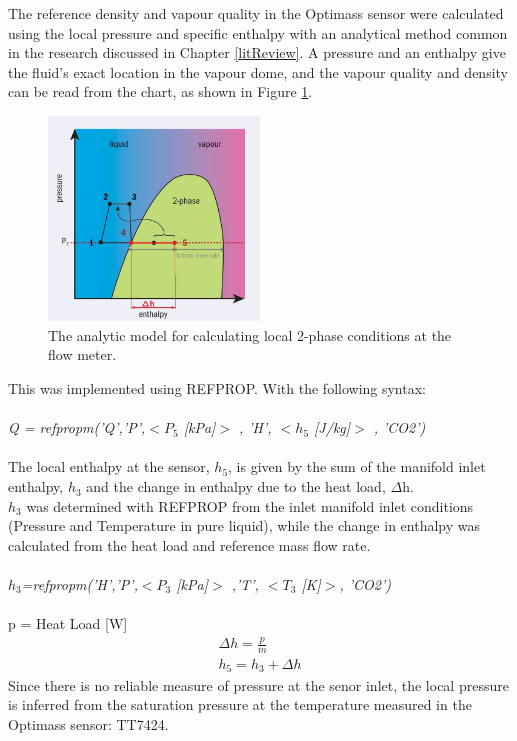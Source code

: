 \documentclass{report}
\begin{document}
The reference density and vapour quality in the Optimass sensor were calculated using the local pressure and specific enthalpy with an analytical method common in the research discussed in Chapter \ref{litReview}. A pressure and an enthalpy give the fluid's exact location in the vapour dome, and the vapour quality and density can be read from the chart, as shown in Figure \ref{fig:enthalpyMethod}. \FloatBarrier
\begin{figure}
\centering
\includegraphics[width=0.5\textwidth]{enthalpyMethod.jpg}
\caption{The analytic model for calculating local 2-phase conditions at the flow meter.}
\label{fig:enthalpyMethod}
\end{figure}
\FloatBarrier
This was implemented using REFPROP. With the following syntax: \\\\
\textit{Q = refpropm('Q','P',$<P_5$ [kPa]$>$ , 'H', $<h_5$ [J/kg]$>$ , 'CO2')} \\\\
The local enthalpy at the sensor, \textit{$h_5$}, is given by the sum of the manifold inlet enthalpy, $h_3$ and the change in enthalpy due to the heat load, $\Delta$h.\\
\textit{$h_3$} was determined with REFPROP from the inlet manifold inlet conditions (Pressure and Temperature in pure liquid), while the change in enthalpy was calculated from the heat load and reference mass flow rate.\\\\
\textit{$h_3$=refpropm('H','P',$<P_3$ [kPa]$>$ ,'T', $<T_3$ [K]$>$, 'CO2')}\\\\
p = Heat Load [W]\\
\begin{eqnarray}
\Delta h=\frac{p}{\dot{m}}\\
h_5=h_3+\Delta h
\end{eqnarray}
\FloatBarrier
Since there is no reliable measure of pressure at the senor inlet, the local pressure is inferred from the saturation pressure at the temperature measured in the Optimass sensor: TT7424.
\end{document}
